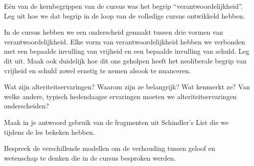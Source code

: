 \documentclass[main.tex]{subfiles}
\begin{document}
\begin{examenvraag}
    \begin{vraag}
        Eén van de kernbegrippen van de cursus was het begrip “verantwoordelijkheid”. Leg uit hoe we dat begrip in de loop van de volledige cursus ontwikkeld hebben.
    \end{vraag}

    \begin{antwoord}
    \end{antwoord}
\end{examenvraag}


\begin{examenvraag}
    \begin{vraag}
        In de cursus hebben we een onderscheid gemaakt tussen drie vormen van verantwoordelijkheid. Elke vorm van verantwoordelijkheid hebben we verbonden met een bepaalde invulling van vrijheid en een bepaalde invulling van schuld. Leg dit uit. Maak ook duidelijk hoe dit ons geholpen heeft het neoliberale begrip van vrijheid en schuld zowel ernstig te nemen alsook te nuanceren.
    \end{vraag}

    \begin{antwoord}
    \end{antwoord}
\end{examenvraag}


\begin{examenvraag}
    \begin{vraag}
        Wat zijn alteriteitservaringen? Waarom zijn ze belangrijk? Wat kenmerkt ze? Van welke andere, typisch hedendaagse ervaringen moeten we alteriteitservaringen onderscheiden?
    \end{vraag}

    \begin{antwoord}
    \end{antwoord}
\end{examenvraag}


\begin{examenvraag}
    \begin{vraag}
        Maak in je antwoord gebruik van de fragmenten uit Schindler’s List die we tijdens de les bekeken hebben.
    \end{vraag}

    \begin{antwoord}
    \end{antwoord}
\end{examenvraag}


\begin{examenvraag}
    \begin{vraag}
        Bespreek de verschillende modellen om de verhouding tussen geloof en wetenschap te denken die in de cursus besproken werden.
    \end{vraag}

    \begin{antwoord}
    \end{antwoord}
\end{examenvraag}
\end{document}
